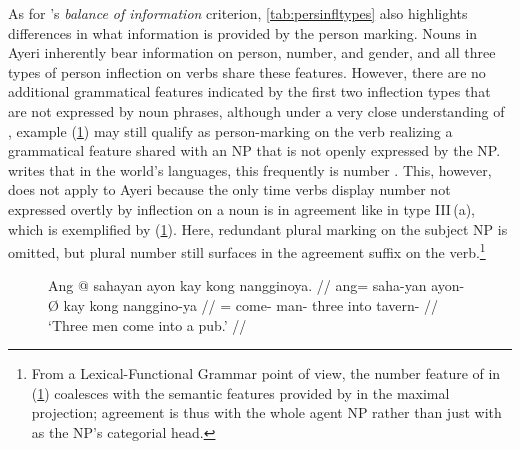 As for \citet{corbett2006}'s \emph{balance of information} criterion,
\autoref{tab:persinfltypes} also highlights differences in what information is
provided by the person marking. Nouns in Ayeri inherently bear information on
person, number, and gender, and all three types of person inflection on verbs
share these features. However, there are no additional grammatical features
indicated by the first two inflection types that are not expressed by noun
phrases, although under a very close understanding of \citet{corbett2006},
example (\ref{ex:verbplagr}) may still qualify as person-marking on the verb
realizing a grammatical feature shared with an NP that is not openly expressed
by the NP. \citet{corbett2006} writes that in the world's languages, this
frequently is number \citep[105]{corbett2006}. This, however, does not apply to
Ayeri because the only time verbs display number not expressed overtly by
inflection on a noun is in agreement like in type III\,(a), which is
exemplified by (\ref{ex:verbplagr}). Here, redundant plural marking on the
subject NP is omitted, but plural number still surfaces in the agreement suffix
on the verb.\footnote{From a Lexical-Functional Grammar point of view, the
number feature of  in (\ref{ex:verbplagr}) coalesces with the
semantic features provided by  in the maximal projection;
agreement is thus with the whole agent NP rather than just with
 as the NP's categorial head.}

\begin{figure}[h]
\ex\label{ex:verbplagr} %
\begingl
	\gla Ang @ sahayan ayon kay kong nangginoya. //
	\glb ang= saha-yan ayon-Ø kay kong nanggino-ya //
	\glc \AgtT{}= come-\TplM{} man-\Top{} three into tavern-\Loc{} //
	\glft `Three men come into a pub.' //
\endgl\xe
\end{figure}

